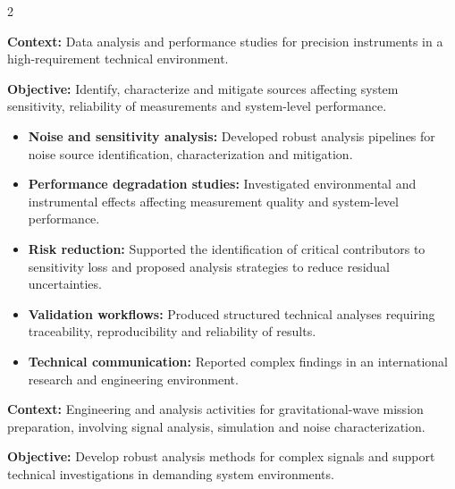 \documentclass[8pt,a4paper,ragged2e,withhyper]{altacv}
\begin{document}
\begin{paracol}{2}
\divider


\textbf{Context:} Data analysis and performance studies for precision instruments in a high-requirement technical environment.

\textbf{Objective:} Identify, characterize and mitigate sources affecting system sensitivity, reliability of measurements and system-level performance.

\begin{itemize}
\item \textbf{Noise and sensitivity analysis:} Developed robust analysis pipelines for noise source identification, characterization and mitigation.
\item \textbf{Performance degradation studies:} Investigated environmental and instrumental effects affecting measurement quality and system-level performance.
\item \textbf{Risk reduction:} Supported the identification of critical contributors to sensitivity loss and proposed analysis strategies to reduce residual uncertainties.
\item \textbf{Validation workflows:} Produced structured technical analyses requiring traceability, reproducibility and reliability of results.
\item \textbf{Technical communication:} Reported complex findings in an international research and engineering environment.
\end{itemize}

\divider


\textbf{Context:} Engineering and analysis activities for gravitational-wave mission preparation, involving signal analysis, simulation and noise characterization.

\textbf{Objective:} Develop robust analysis methods for complex signals and support technical investigations in demanding system environments.


\end{paracol}
\end{document}
